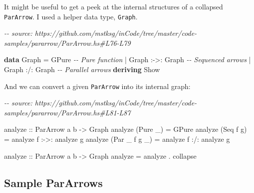 \documentclass[]{article}
\newenvironment{Shaded}{}{}
\newcommand{\CommentTok}[1]{\textcolor[rgb]{0.38,0.63,0.69}{\textit{#1}}}
\newcommand{\DataTypeTok}[1]{\textcolor[rgb]{0.56,0.13,0.00}{#1}}
\newcommand{\KeywordTok}[1]{\textcolor[rgb]{0.00,0.44,0.13}{\textbf{#1}}}
\newcommand{\NormalTok}[1]{#1}
\newcommand{\OperatorTok}[1]{\textcolor[rgb]{0.40,0.40,0.40}{#1}}
\newcommand{\OtherTok}[1]{\textcolor[rgb]{0.00,0.44,0.13}{#1}}
\begin{document}
It might be useful to get a peek at the internal structures of a collapsed
\texttt{ParArrow}. I used a helper data type, \texttt{Graph}.

\begin{Shaded}
\begin{Highlighting}[]
\CommentTok{{-}{-} source: https://github.com/mstksg/inCode/tree/master/code{-}samples/pararrow/ParArrow.hs\#L76{-}L79}

\KeywordTok{data} \DataTypeTok{Graph} \OtherTok{=} \DataTypeTok{GPure}                  \CommentTok{{-}{-} Pure function}
           \OperatorTok{|} \DataTypeTok{Graph} \OperatorTok{:{-}\textgreater{}:} \DataTypeTok{Graph}       \CommentTok{{-}{-} Sequenced arrows}
           \OperatorTok{|} \DataTypeTok{Graph} \OperatorTok{:/:} \DataTypeTok{Graph}        \CommentTok{{-}{-} Parallel arrows}
           \KeywordTok{deriving} \DataTypeTok{Show}
\end{Highlighting}
\end{Shaded}

And we can convert a given \texttt{ParArrow} into its internal graph:

\begin{Shaded}
\begin{Highlighting}[]
\CommentTok{{-}{-} source: https://github.com/mstksg/inCode/tree/master/code{-}samples/pararrow/ParArrow.hs\#L81{-}L87}

\OtherTok{analyze\textquotesingle{} ::} \DataTypeTok{ParArrow}\NormalTok{ a b }\OtherTok{{-}\textgreater{}} \DataTypeTok{Graph}
\NormalTok{analyze\textquotesingle{} (}\DataTypeTok{Pure}\NormalTok{ \_) }\OtherTok{=} \DataTypeTok{GPure}
\NormalTok{analyze\textquotesingle{} (}\DataTypeTok{Seq}\NormalTok{ f g) }\OtherTok{=}\NormalTok{ analyze\textquotesingle{} f }\OperatorTok{:{-}\textgreater{}:}\NormalTok{ analyze\textquotesingle{} g}
\NormalTok{analyze\textquotesingle{} (}\DataTypeTok{Par}\NormalTok{ \_ f g \_) }\OtherTok{=}\NormalTok{ analyze\textquotesingle{} f }\OperatorTok{:/:}\NormalTok{ analyze\textquotesingle{} g}

\OtherTok{analyze ::} \DataTypeTok{ParArrow}\NormalTok{ a b }\OtherTok{{-}\textgreater{}} \DataTypeTok{Graph}
\NormalTok{analyze }\OtherTok{=}\NormalTok{ analyze\textquotesingle{} }\OperatorTok{.}\NormalTok{ collapse}
\end{Highlighting}
\end{Shaded}

\subsection{Sample ParArrows}\label{sample-pararrows}
\end{document}
